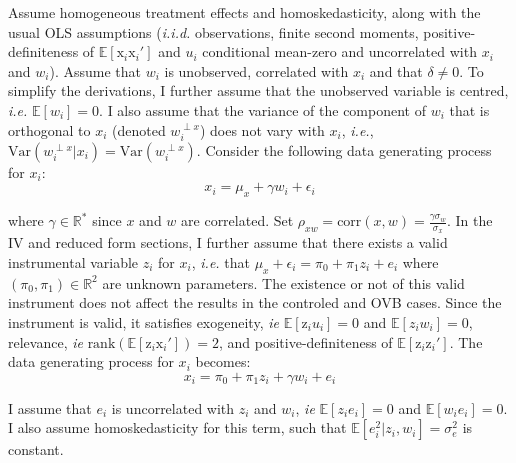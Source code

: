 \documentclass[usletter, 12pt]{article}
\begin{document}
			Assume homogeneous treatment effects and homoskedasticity, along with the usual OLS assumptions (\textit{i.i.d.} observations, finite second moments, positive-definiteness of $\mathbb{E}[\text{x}_i \text{x}_i']$ and $u_{i}$ conditional mean-zero and uncorrelated with $x_i$ and $w_i$). Assume that $w_{i}$ is unobserved, correlated with $x_{i}$ and that $\delta \neq 0$. To simplify the derivations, I further assume that the unobserved variable is centred, \textit{i.e.} $\mathbb{E}[w_i] = 0$. I also assume that the variance of the component of $w_{i}$ that is orthogonal to $x_{i}$ (denoted $w_{i}^{\perp x}$) does not vary with $x_{i}$, \textit{i.e.}, $\text{Var}(w_{i}^{\perp x}|x_{i}) = \text{Var}(w_{i}^{\perp x})$. Consider the following data generating process for $x_i$:
				~
				\begin{equation}\label{maths_dgp_x}
					x_i = \mu_{x} + \gamma w_{i} + \epsilon_i
				\end{equation}
				
				where $\gamma \in \mathbb{R}^{*}$ since $x$ and $w$ are correlated. Set $\rho_{xw} = \text{corr}(x, w) =  \frac{\gamma \sigma_{w}}{\sigma_{x}}$. In the IV and reduced form sections, I further assume that there exists a valid instrumental variable $z_i$ for $x_i$, \textit{i.e.} that $\mu_x + \epsilon_{i} = \pi_0 + \pi_1 z_i + e_{i}$  where $(\pi_0, \pi_1) \in \mathbb{R}^{2}$ are unknown parameters. The existence or not of this valid instrument does not affect the results in the controled and \textsc{OVB} cases. Since the instrument is valid, it satisfies exogeneity, \textit{ie} $\mathbb{E}[\text{z}_{i}u_{i}] = 0$ and  $\mathbb{E}[z_{i}w_{i}] = 0$, relevance, \textit{ie} $\text{rank}(\mathbb{E}[\text{z}_{i}\text{x}_i']) = 2$,  and positive-definiteness of $\mathbb{E}[\text{z}_i \text{z}_i']$. The data generating process for $x_i$ becomes:			
				~
				\begin{equation}\label{maths_dgp_x_iv}
					x_i = \pi_0 + \pi_1 z_i + \gamma w_{i} + e_{i}
				\end{equation}
				
				I assume that $e_{i}$ is uncorrelated with $z_i$ and $w_{i}$, \textit{ie} $\mathbb{E}[z_ie_{i}] = 0$ and $\mathbb{E}[w_ie_{i}] = 0$. I also assume homoskedasticity for this term, such that $\mathbb{E}[e_{i}^{2} | z_{i}, w_{i}] = \sigma_{e}^{2}$ is constant.\\ %
				
\end{document}
